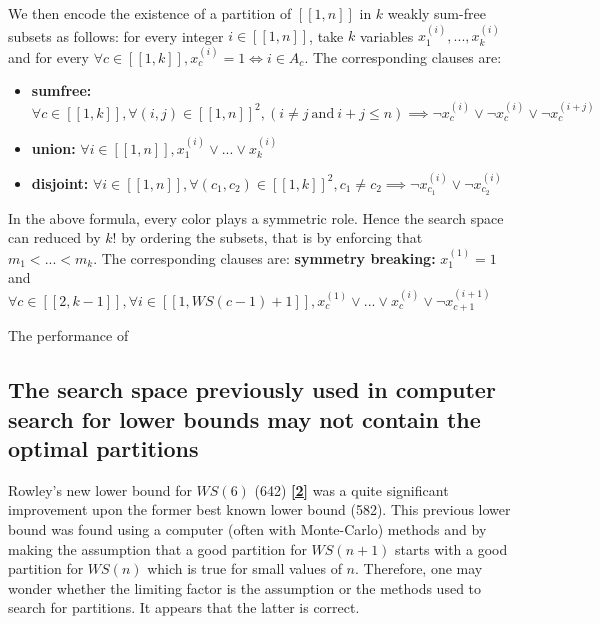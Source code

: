 We then encode the existence of a partition of \([\![1,n]\!]\) in \(k\)  weakly sum-free subsets as follows: for every integer 
\(i \in [\![1,n]\!]\), take \(k\) variables \(x^{(i)}_{1}, ..., x^{(i)}_{k}\) and for every \(\forall c \in [\![1,k]\!], x^{(i)}_c = 1 \iff i \in A_c\). 
The corresponding clauses are:

\begin{itemize}
	\item \textbf{sumfree:} \(\forall c \in  [\![1,k]\!], \forall (i, j) \in [\![1,n]\!]^2, (i \neq j ~ \text{and} ~ i + j \leq n) \implies \lnot x^{(i)}_c 
	\lor  \lnot x^{(i)}_c \lor \lnot x^{(i+j)}_c\)
	\item \textbf{union:} \(\forall i \in [\![1,n]\!], x^{(i)}_1 \lor ... \lor x^{(i)}_k\)
	\item \textbf{disjoint:} \(\forall i \in [\![1,n]\!],\forall (c_1, c_2) \in  [\![1,k]\!]^2, c_1 \neq c_2 \implies \neg x^{(i)}_{c_1} \lor \neg x^{(i)}_{c_2}\)
\end{itemize} 

In the above formula, every color plays a symmetric role. Hence the search space can reduced by \(k!\) by ordering the subsets, that is by 
enforcing that \(m_1 < ... < m_k\). The corresponding clauses are: \linebreak
\textbf{symmetry breaking:}  \(x^{(1)}_1 = 1\) and \(\forall c \in [\![2,k-1]\!], \forall i \in [\![1,WS(c - 1)+1]\!], x^{(1)}_c \lor ... \lor x^{(i)}_c \lor \neg x^{(i+1)}_{c+1}\)

\begin{remark}
	The performance of
\end{remark}


\subsection{The search space previously used in computer search for lower bounds may not contain the optimal partitions}

Rowley's new lower bound for \(WS(6)\) (642)  \hyperlink{label2}{\textbf{[2]}} was a quite significant improvement upon the former 
best known lower bound (582). This previous lower bound was found using a computer (often with Monte-Carlo) methods and by making the 
assumption that a good partition for \(WS(n+1)\) starts with a good partition for \(WS(n)\) which is true for small values of \(n\).
Therefore, one may wonder whether the limiting factor is the assumption or the methods used to search for partitions. It appears that 
the latter is correct.

